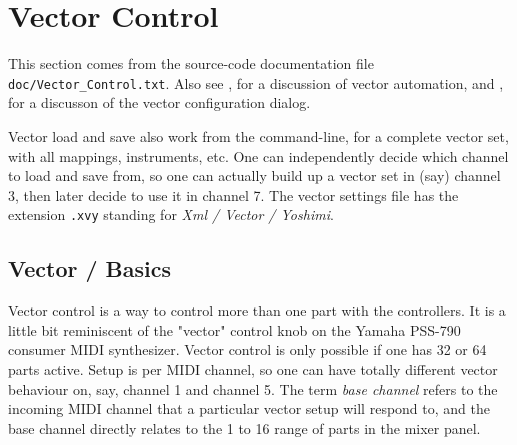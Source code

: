 %
%
%

\section{Vector Control}
\label{sec:vector}

   This section comes from the source-code documentation file
   \texttt{doc/Vector\_Control.txt}.
   Also see 
   , for a discussion
   of vector automation, and
   , for a discusson of the vector
   configuration dialog.

   Vector load and save also work from the command-line, for a complete vector
   set, with all mappings, instruments, etc.
   One can independently decide which
   channel to load and save from, so one can actually build up a vector set in
   (say) channel 3, then later decide to use it in channel 7.
   The vector settings file
   has the extension \texttt{.xvy} standing for 
   \textsl{Xml / Vector / Yoshimi}.

\subsection{Vector / Basics}
\label{subsection:vector_basics}

   Vector control is a way to control more than one part with the controllers.
   It is a little bit reminiscent of the "vector" control knob on the Yamaha
   PSS-790 consumer MIDI synthesizer.  Vector control is only possible if one
   has 32 or 64 parts active.  Setup is per MIDI channel, so one can have
   totally different vector behaviour on, say, channel 1 and channel 5.
    The term \textsl{base channel} refers to the
   incoming MIDI channel that a particular vector setup will respond to, and
   the base channel directly relates to the 1 to 16 range of parts in the mixer
   panel.

